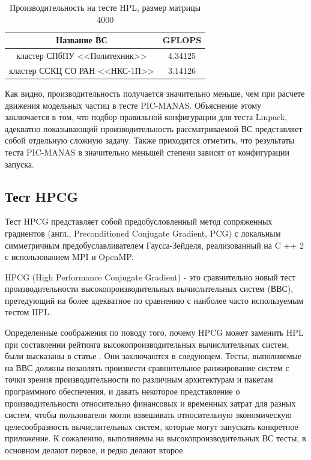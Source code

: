 \begin{table}[ht]
\caption{Производительность на тесте HPL, размер матрицы 4000}
\begin{center}
\begin{tabular}{|c|c|}
	Название ВС                & GFLOPS \\ \hline
кластер СПбПУ <<Политехник>>   &  4.34125 	          \\  
кластер ССКЦ СО РАН <<НКС-1П>> &  3.14126 	      \\ \hline
\end{tabular}
\end{center}
\label{}
\end{table}

Как видно, производительность получается значительно меньше, чем при расчете движения модельных частиц в тесте PIC-MANAS. Объяснение этому заключается  в том, что  подбор правильной конфигурации для теста Linpack, адекватно показывающий производительность рассматриваемой ВС представляет собой отдельную сложную задачу. Также приходится отметить, что результаты теста PIC-MANAS в значительно меньшей степени зависят от конфигурации запуска.


\subsection{Тест HPCG}
Тест HPCG представляет собой предобусловленный метод сопряженных градиентов
(англ., Preconditioned Conjugate Gradient, PCG) с локальным симметричным предобуславливателем Гаусса-Зейделя, реализованный на C ++ 2 с использованием MPI и OpenMP. 

HPCG (High Performance Conjugate Gradient) \cite{Dongarra2016HighperformanceCB} - это сравнительно новый тест производительности высокопроизводительных вычислительных систем (ВВС), претедующий на более адекватное по сравнению с наиболее часто используемым тестом HPL.

Определенные соображения по поводу того, почему HPCG может заменить HPL при составлении рейтинга высокопроизводительных вычислительных систем, были высказаны в статье \cite{HPCGreplaceHPL}. Они заключаются в следующем. Тесты, выполняемые на ВВС должны позаолять произвести сравнительное ранжирование систем с точки зрения производительности по различным архитектурам и пакетам программного обеспечения, и давать некоторое представление о производительности относительно финансовых и временных затрат для разных систем, чтобы пользователи могли взвешивать относительную экономическую целесообразность вычислительных систем, которые могут запускать конкретное приложение. К сожалению, выполняемы на высокопроизводительных ВС тесты, в основном делают первое, и редко делают второе. 

